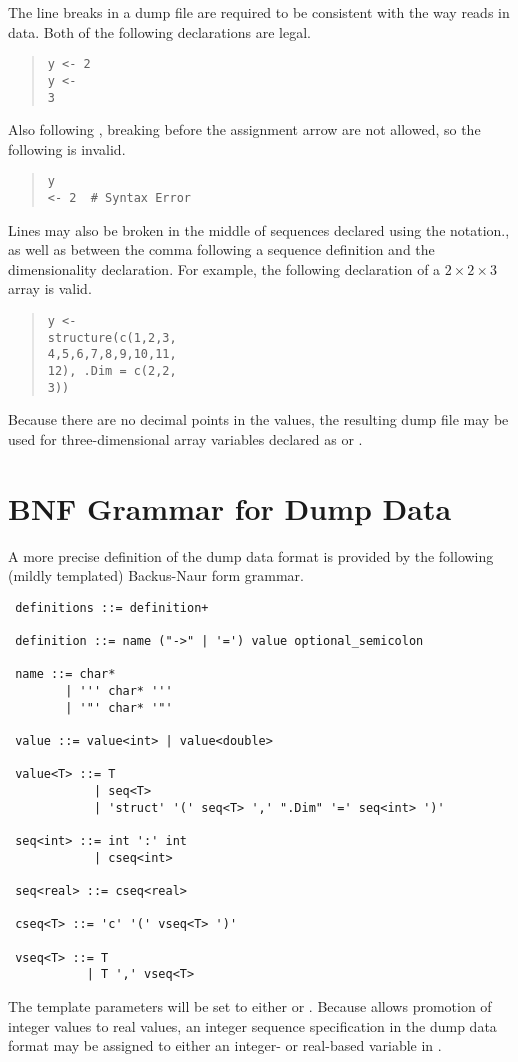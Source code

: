 The line breaks in a dump file are required to be consistent with
the way \R reads in data.  Both of the following declarations are
legal.
%
\begin{quote}
\begin{Verbatim}
y <- 2
y <-
3
\end{Verbatim}
\end{quote}
%
Also following \R, breaking before the assignment arrow are not
allowed, so the following is invalid.
%
\begin{quote}
\begin{Verbatim}
y
<- 2  # Syntax Error
\end{Verbatim}
\end{quote}

Lines may also be broken in the middle of sequences declared
using the  notation., as well as between the comma
following a sequence definition and the dimensionality declaration.
For example, the following declaration of a $2 \times 2 \times 3$
array is valid.
%
\begin{quote}
\begin{Verbatim}
y <-
structure(c(1,2,3,
4,5,6,7,8,9,10,11,
12), .Dim = c(2,2,
3))
\end{Verbatim}
\end{quote}
%
Because there are no decimal points in the values, the resulting dump
file may be used for three-dimensional array variables declared as
 or .

\section{BNF Grammar for Dump Data}

A more precise definition of the dump data format is provided
by the following (mildly templated) Backus-Naur form grammar.

{\small 
\begin{verbatim}
 definitions ::= definition+

 definition ::= name ("->" | '=') value optional_semicolon

 name ::= char* 
        | ''' char* ''' 
        | '"' char* '"'

 value ::= value<int> | value<double>

 value<T> ::= T 
            | seq<T>
            | 'struct' '(' seq<T> ',' ".Dim" '=' seq<int> ')'

 seq<int> ::= int ':' int
            | cseq<int>

 seq<real> ::= cseq<real>

 cseq<T> ::= 'c' '(' vseq<T> ')'

 vseq<T> ::= T
           | T ',' vseq<T>
\end{verbatim}
}
\noindent
The template parameters  will be set to either  or
.  Because \Stan allows promotion of integer values to real
values, an integer sequence specification in the dump data format may
be assigned to either an integer- or real-based variable in \Stan.







